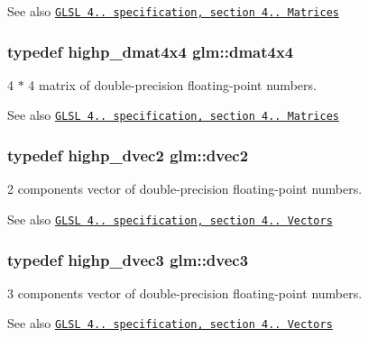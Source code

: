 \begin{DoxySeeAlso}{See also}
\href{http://www.opengl.org/registry/doc/GLSLangSpec.4.20.8.pdf}{\tt G\+L\+SL 4.. specification, section 4.. Matrices} 
\end{DoxySeeAlso}
\subsubsection[{\texorpdfstring{dmat4x4}{dmat4x4}}]{\setlength{\rightskip}{0pt plus 5cm}typedef highp\+\_\+dmat4x4 {\bf glm\+::dmat4x4}}\hypertarget{group__core__types_ga54d90d4b902d93638b906571af215bb1}{}\label{group__core__types_ga54d90d4b902d93638b906571af215bb1}
4 $\ast$ 4 matrix of double-\/precision floating-\/point numbers.

\begin{DoxySeeAlso}{See also}
\href{http://www.opengl.org/registry/doc/GLSLangSpec.4.20.8.pdf}{\tt G\+L\+SL 4.. specification, section 4.. Matrices} 
\end{DoxySeeAlso}
\subsubsection[{\texorpdfstring{dvec2}{dvec2}}]{\setlength{\rightskip}{0pt plus 5cm}typedef highp\+\_\+dvec2 {\bf glm\+::dvec2}}\hypertarget{group__core__types_gae6727259898288cae197724d5f172b3b}{}\label{group__core__types_gae6727259898288cae197724d5f172b3b}
2 components vector of double-\/precision floating-\/point numbers.

\begin{DoxySeeAlso}{See also}
\href{http://www.opengl.org/registry/doc/GLSLangSpec.4.20.8.pdf}{\tt G\+L\+SL 4.. specification, section 4.. Vectors} 
\end{DoxySeeAlso}
\subsubsection[{\texorpdfstring{dvec3}{dvec3}}]{\setlength{\rightskip}{0pt plus 5cm}typedef highp\+\_\+dvec3 {\bf glm\+::dvec3}}\hypertarget{group__core__types_ga7f3287f952e6ccb481231368091702ac}{}\label{group__core__types_ga7f3287f952e6ccb481231368091702ac}
3 components vector of double-\/precision floating-\/point numbers.

\begin{DoxySeeAlso}{See also}
\href{http://www.opengl.org/registry/doc/GLSLangSpec.4.20.8.pdf}{\tt G\+L\+SL 4.. specification, section 4.. Vectors} 
\end{DoxySeeAlso}
